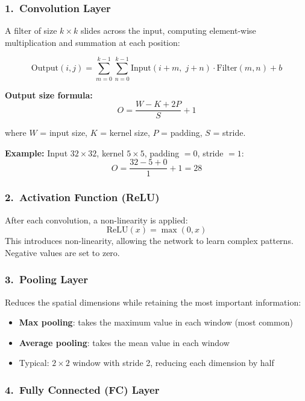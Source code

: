 \documentclass[11pt,a4paper]{article}
\begin{document}
\subsubsection*{1.\ Convolution Layer}

A filter of size $k \times k$ slides across the input, computing element-wise multiplication and summation at each position:

\begin{equation}
\text{Output}(i,j) = \sum_{m=0}^{k-1} \sum_{n=0}^{k-1} \text{Input}(i+m,\; j+n) \cdot \text{Filter}(m,n) + b
\end{equation}

\textbf{Output size formula:}
\begin{equation}
\boxed{O = \frac{W - K + 2P}{S} + 1}
\end{equation}

where $W$ = input size, $K$ = kernel size, $P$ = padding, $S$ = stride.

\textbf{Example:} Input $32 \times 32$, kernel $5 \times 5$, padding $= 0$, stride $= 1$:
\[
O = \frac{32 - 5 + 0}{1} + 1 = 28
\]

\subsubsection*{2.\ Activation Function (ReLU)}

After each convolution, a non-linearity is applied:
\[
\text{ReLU}(x) = \max(0, x)
\]
This introduces non-linearity, allowing the network to learn complex patterns. Negative values are set to zero.

\subsubsection*{3.\ Pooling Layer}

Reduces the spatial dimensions while retaining the most important information:
\begin{itemize}[leftmargin=1.5em]
    \item \textbf{Max pooling}: takes the maximum value in each window (most common)
    \item \textbf{Average pooling}: takes the mean value in each window
    \item Typical: $2 \times 2$ window with stride 2, reducing each dimension by half
\end{itemize}

\subsubsection*{4.\ Fully Connected (FC) Layer}
\end{document}

